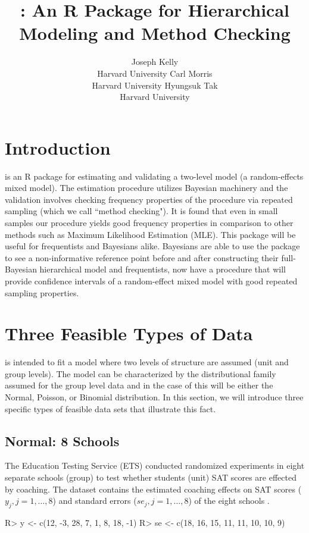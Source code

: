 \documentclass[article]{jss}
\author{Joseph Kelly\\Harvard University \And 
             Carl Morris\\ Harvard University\And
             Hyungsuk Tak\\Harvard University }
\title{\pkg{Rgbp}: An R Package for Hierarchical Modeling and Method Checking}
\begin{document}

\section[introduction]{Introduction}
 is an R package for estimating and validating a two-level model (a random-effects mixed model). The estimation procedure utilizes Bayesian machinery and the validation involves checking frequency properties of the procedure via repeated sampling (which we call ``method checking"). It is found that even in small samples our procedure yields good frequency properties in comparison to other methods such as Maximum Likelihood Estimation (MLE). This package will be useful for frequentists and Bayesians alike. Bayesians are able to use the package to see a non-informative reference point before and after constructing their full-Bayesian hierarchical model and frequentists, now have a procedure that will provide confidence intervals of a random-effect mixed model with good repeated sampling properties.

\section[Feasible Data Types]{Three Feasible Types of Data }
 is intended to fit a model where two levels of structure are assumed (unit and group levels). The model can be characterized by the distributional family assumed for the group level data and in the case of  this will be either the Normal, Poisson, or Binomial distribution. In this section, we will introduce three specific types of feasible data sets that illustrate this fact.

\subsection{Normal: 8 Schools}
The Education Testing Service (ETS) conducted randomized experiments in eight separate schools (group) to test whether students (unit) SAT scores are effected by coaching. The dataset contains the estimated coaching effects on SAT scores ($y_{j}, j=1, \ldots, 8$) and standard errors ($se_{j}, j=1, \ldots, 8$) of the eight schools \cite{1981}.
\begin{CodeChunk}
\begin{CodeInput}
R> y  <- c(12, -3, 28,  7,  1,  8, 18, -1)
R> se <- c(18, 16, 15, 11, 11, 10, 10,  9)
\end{CodeInput}
\end{CodeChunk}
\end{document}
